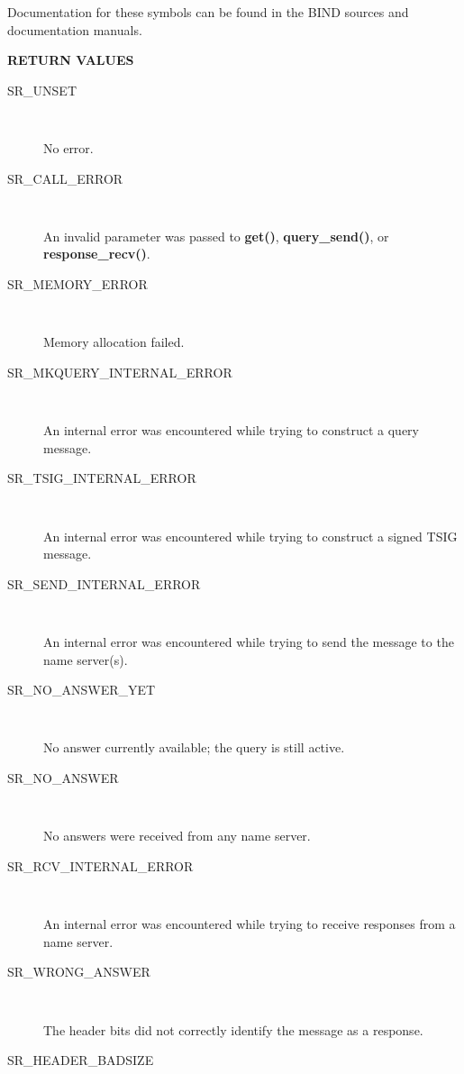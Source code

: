 Documentation for these symbols can be found in the BIND sources and
documentation manuals.

{\bf RETURN VALUES}

\begin{description}

\item [SR\_UNSET]\verb" "

No error.

\item [SR\_CALL\_ERROR]\verb" "

An invalid parameter was passed to {\bf get()}, {\bf query\_send()}, or
{\bf response\_recv()}.

\item [SR\_MEMORY\_ERROR]\verb" "

Memory allocation failed.

\item [SR\_MKQUERY\_INTERNAL\_ERROR]\verb" "

An internal error was encountered while trying to construct a
query message.

\item [SR\_TSIG\_INTERNAL\_ERROR]\verb" "

An internal error was encountered while trying to construct a
signed TSIG message.

\item [SR\_SEND\_INTERNAL\_ERROR]\verb" "

An internal error was encountered while trying to send the
message to the name server(s).

\item [SR\_NO\_ANSWER\_YET]\verb" "

No answer currently available; the query is still active.

\item [SR\_NO\_ANSWER]\verb" "

No answers were received from any name server.

\item [SR\_RCV\_INTERNAL\_ERROR]\verb" "

An internal error was encountered while trying to receive
responses from a name server.

\item [SR\_WRONG\_ANSWER]\verb" "

The header bits did not correctly identify the message as a response.

\item [SR\_HEADER\_BADSIZE]\verb" "


\end{description}
